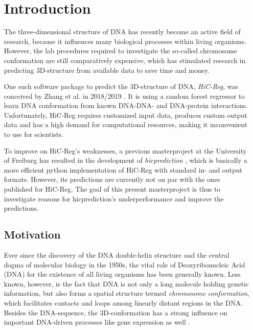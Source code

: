\section{Introduction} \label{sec:intro}
The three-dimensional structure of DNA has recently become an active field of research,
because it influences many biological processes within living organisms.
However, the lab procedures required to investigate the so-called chromosome conformation
are still comparatively expensive, which has stimulated research in predicting 
3D-structure from available data to save time and money.

One such software package to predict the 3D-structure of DNA, \emph{HiC-Reg}, was conceived by Zhang et al. in 2018/2019 \cite{Zhang2018,Zhang2019}.
It is using a random forest regressor to learn DNA conformation from known DNA-DNA- and DNA-protein interactions. 
Unfortunately, HiC-Reg requires customized input data, produces custom output data
and has a high demand for computational resources, making it inconvenient to use for scientists.

To improve on HiC-Reg's weaknesses, a previous masterproject at the University of Freiburg 
has resulted in the development of \emph{hicprediction} \cite{Bajorat2019}, 
which is basically a more efficient python implementation of HiC-Reg with standard in- and output formats.
However, its predictions are currently not on par with the ones published for HiC-Reg.
The goal of this present masterproject is thus to investigate reasons for hicprediction's underperformance
and improve the predictions.

\subsection{Motivation}
Ever since the discovery of the DNA double-helix structure \cite{Watson1953} and the central dogma of molecular biology \cite{Crick1958} in the 1950s,
the vital role of Deoxyribonucleic Acid (DNA) for the existence of all living organisms has been generally known.
Less known, however, is the fact that DNA is not only a long molecule holding genetic information, 
but also forms a spatial structure termed \emph{chromosome conformation}, 
which facilitates contacts and loops among linearly distant regions in the DNA. 
Besides the DNA-sequence, the 3D-conformation has a strong influence on important DNA-driven processes
like gene expression as well \cite{Pombo2015,Bonev2016}.

